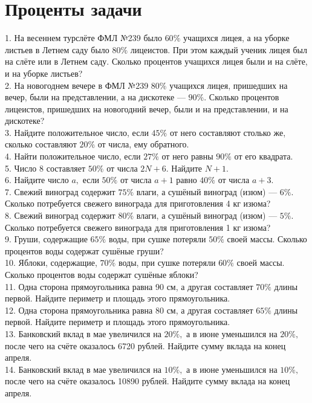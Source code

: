 \section{Проценты задачи}
1. На весеннем турслёте ФМЛ №239 было $60\%$ учащихся лицея, а на уборке листьев в Летнем саду было $80\%$ лицеистов. При этом каждый ученик лицея был на слёте или в Летнем саду. Сколько процентов учащихся лицея были и на слёте, и на уборке листьев?\\
2. На новогоднем вечере в ФМЛ №239 $80\%$ учащихся лицея, пришедших на вечер, были на представлении, а на дискотеке --- $90\%$. Сколько процентов лицеистов, пришедших на новогодний вечер, были и на представлении, и на дискотеке?\\
3. Найдите положительное число, если $45\%$ от него составляют столько же, сколько составляют $20\%$ от числа, ему обратного.\\
4. Найти положительное число, если $27\%$ от него равны $90\%$ от его квадрата.\\
5. Число 8 составляет $50\%$ от числа $2N+6.$ Найдите $N+1.$\\
6. Найдите число $a,$ если $50\%$ от числа $a+1$ равно $40\%$ от числа $a+3.$\\
7. Свежий виноград содержит $75\%$ влаги, а сушёный виноград (изюм) --- $6\%.$
Сколько потребуется свежего винограда для приготовления 4 кг изюма?\\
8. Свежий виноград содержит $80\%$ влаги, а сушёный виноград (изюм) --- $5\%.$
Сколько потребуется свежего винограда для приготовления 1 кг изюма?\\
9. Груши, содержащие $65\%$ воды, при сушке потеряли $50\%$ своей массы. Сколько процентов воды содержат сушёные груши?\\
10. Яблоки, содержащие, $70\%$ воды, при сушке потеряли $60\%$ своей массы. Сколько
процентов воды содержат сушёные яблоки?\\
11. Одна сторона прямоугольника равна 90 см, а другая составляет $70\%$ длины первой. Найдите периметр и площадь этого прямоугольника.\\
12. Одна сторона прямоугольника равна 80 см, а другая составляет $65\%$ длины первой. Найдите периметр и площадь этого прямоугольника.\\
13. Банковский вклад в мае увеличился на $20\%,$ а в июне уменьшился на $20\%,$ после чего на счёте оказалось 6720 рублей. Найдите сумму вклада на конец апреля.\\
14. Банковский вклад в мае увеличился на $10\%,$ а в июне уменьшился на $10\%,$ после чего на счёте оказалось 10890 рублей. Найдите сумму вклада на конец апреля.\\
